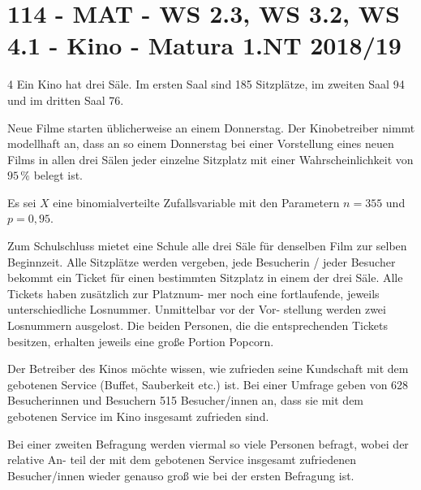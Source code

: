 \section{114 - MAT - WS 2.3, WS 3.2, WS 4.1 - Kino - Matura 1.NT 2018/19}

\begin{langesbeispiel} \item[4] %
Ein Kino hat drei Säle. Im ersten Saal sind 185 Sitzplätze, im zweiten Saal 94 und im dritten Saal 76.

Neue Filme starten üblicherweise an einem Donnerstag. Der Kinobetreiber nimmt modellhaft an, dass an so einem Donnerstag bei einer Vorstellung eines neuen Films in allen drei Sälen jeder einzelne Sitzplatz mit einer Wahrscheinlichkeit von $95\,\%$ belegt ist.%

\begin{aufgabenstellung}
\item Es sei $X$ eine binomialverteilte Zufallsvariable mit den Parametern $n=355$ und $p=0,95$.%


Zum Schulschluss mietet eine Schule alle drei Säle für denselben Film zur selben Beginnzeit.
Alle Sitzplätze werden vergeben, jede Besucherin / jeder Besucher bekommt ein Ticket für
einen bestimmten Sitzplatz in einem der drei Säle. Alle Tickets haben zusätzlich zur Platznum-
mer noch eine fortlaufende, jeweils unterschiedliche Losnummer. Unmittelbar vor der Vor-
stellung werden zwei Losnummern ausgelost. Die beiden Personen, die die entsprechenden
Tickets besitzen, erhalten jeweils eine große Portion Popcorn.


\item Der Betreiber des Kinos möchte wissen, wie zufrieden seine Kundschaft mit dem gebotenen
Service (Buffet, Sauberkeit etc.) ist. Bei einer Umfrage geben von 628 Besucherinnen und
Besuchern 515 Besucher/innen an, dass sie mit dem gebotenen Service im Kino insgesamt
zufrieden sind.%


Bei einer zweiten Befragung werden viermal so viele Personen befragt, wobei der relative An-
teil der mit dem gebotenen Service insgesamt zufriedenen Besucher/innen wieder genauso
groß wie bei der ersten Befragung ist.


\end{aufgabenstellung}
\end{langesbeispiel}
